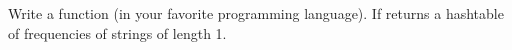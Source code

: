   Write a function (in your favorite programming language).
  If returns a hashtable of frequencies of
  strings of length 1.
